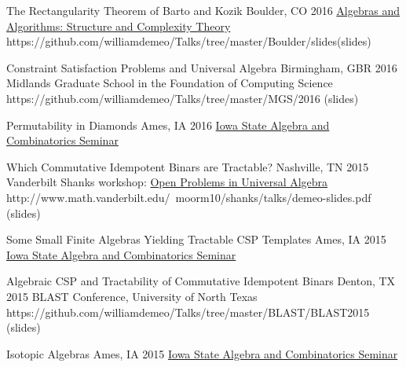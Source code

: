     
    \vspace{\vsp}

\talkurl
    {The Rectangularity Theorem of Barto and Kozik} %
    {Boulder, CO 2016}
    {\href{http://math.colorado.edu/algebra2016/index.html}{Algebras and Algorithms: Structure and Complexity Theory}}
    {https://github.com/williamdemeo/Talks/tree/master/Boulder/slides}{(slides)}

    \vspace{\vsp}

\talkurl
    {Constraint Satisfaction Problems and Universal Algebra}
    {Birmingham, GBR 2016}
    {Midlands Graduate School in the Foundation of Computing Science}
    {https://github.com/williamdemeo/Talks/tree/master/MGS/2016}
    {(slides)}     %

    \vspace{\vsp}

\talk
    {Permutability in Diamonds}
    {Ames, IA 2016}
    {\href{http://orion.math.iastate.edu/jdhsmith/math/smarks15.htm}{Iowa State Algebra and Combinatorics Seminar}}
    
    \vspace{\vsp}

\talkurl
    {Which Commutative Idempotent Binars are Tractable?}
    {Nashville, TN 2015}
    {Vanderbilt Shanks workshop: \href{http://www.math.vanderbilt.edu/~moorm10/shanks/}{Open Problems in Universal Algebra}}
    {http://www.math.vanderbilt.edu/~moorm10/shanks/talks/demeo-slides.pdf}
    {(slides)}    %

    \vspace{\vsp}

\talk
    {Some Small Finite Algebras Yielding Tractable CSP Templates}
    {Ames, IA 2015}
    {\href{http://orion.math.iastate.edu/jdhsmith/math/smarks15.htm}{Iowa State Algebra and Combinatorics Seminar}}    %

    \vspace{\vsp}
\talkurl
    {Algebraic CSP and Tractability of Commutative Idempotent Binars}
    {Denton, TX 2015}
    {BLAST Conference, University of North Texas} 
    {https://github.com/williamdemeo/Talks/tree/master/BLAST/BLAST2015}
    {(slides)}  %

    \vspace{\vsp}

\talk
    {Isotopic Algebras}
    {Ames, IA 2015}
    {\href{http://orion.math.iastate.edu/jdhsmith/math/smarks15.htm}{Iowa State Algebra and Combinatorics Seminar}} 
    
